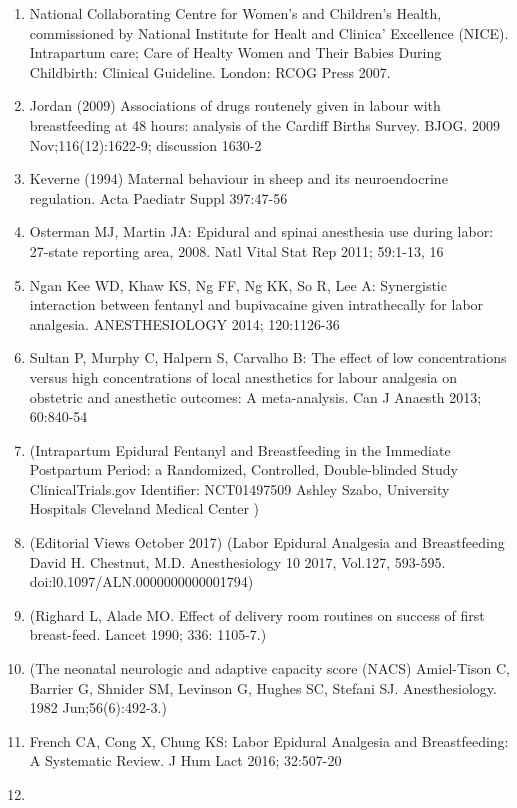\documentclass[]{article}
\begin{document}
\begin{enumerate}
\def\labelenumi{\arabic{enumi}.}
\item
  National Collaborating Centre for Women's and Children's Health,
  commissioned by National Institute for Healt and Clinica' Excellence
  (NICE). Intrapartum care; Care of Healty Women and Their Babies During
  Childbirth: Clinical Guideline. London: RCOG Press 2007.
\item
  Jordan (2009) Associations of drugs routenely given in labour with
  breastfeeding at 48 hours: analysis of the Cardiff Births Survey.
  BJOG. 2009 Nov;116(12):1622-9; discussion 1630-2
\item
  Keverne (1994) Maternal behaviour in sheep and its neuroendocrine
  regulation. Acta Paediatr Suppl 397:47-56
\item
  Osterman MJ, Martin JA: Epidural and spinai anesthesia use during
  labor: 27-state reporting area, 2008. Natl Vital Stat Rep 2011;
  59:1-13, 16
\item
  Ngan Kee WD, Khaw KS, Ng FF, Ng KK, So R, Lee A: Synergistic
  interaction between fentanyl and bupivacaine given intrathecally for
  labor analgesia. ANESTHESIOLOGY 2014; 120:1126-36
\item
  Sultan P, Murphy C, Halpern S, Carvalho B: The effect of low
  concentrations versus high concentrations of local anesthetics for
  labour analgesia on obstetric and anesthetic outcomes: A
  meta-analysis. Can J Anaesth 2013; 60:840-54
\item
  (Intrapartum Epidural Fentanyl and Breastfeeding in the Immediate
  Postpartum Period: a Randomized, Controlled, Double-blinded Study
  ClinicalTrials.gov Identifier: NCT01497509 Ashley Szabo, University
  Hospitals Cleveland Medical Center )
\item
  (Editorial Views October 2017) (Labor Epidural Analgesia and
  Breastfeeding David H. Chestnut, M.D. Anesthesiology 10 2017, Vol.127,
  593-595. doi:l0.1097/ALN.0000000000001794)
\item
  (Righard L, Alade MO. Effect of delivery room routines on success of
  first breast-feed. Lancet 1990; 336: 1105-7.)
\item
  (The neonatal neurologic and adaptive capacity score (NACS)
  Amiel-Tison C, Barrier G, Shnider SM, Levinson G, Hughes SC, Stefani
  SJ. Anesthesiology. 1982 Jun;56(6):492-3.)
\item
  French CA, Cong X, Chung KS: Labor Epidural Analgesia and
  Breastfeeding: A Systematic Review. J Hum Lact 2016; 32:507-20
\item

\end{enumerate}
\end{document}
